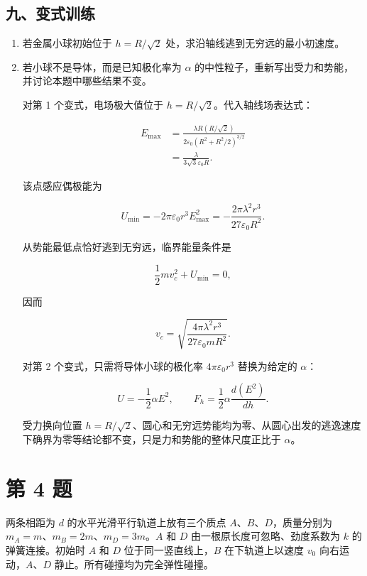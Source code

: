 \documentclass[12pt,a4paper,UTF8]{ctexart}
\begin{document}
\subsection{九、变式训练}\label{ux4e5dux53d8ux5f0fux8badux7ec3-2}

\begin{enumerate}
\def\labelenumi{\arabic{enumi}.}
\item
  若金属小球初始位于 \(h=R/\sqrt2\) 处，求沿轴线逃到无穷远的最小初速度。
\item
  若小球不是导体，而是已知极化率为 \(\alpha\)
  的中性粒子，重新写出受力和势能，并讨论本题中哪些结果不变。

  对第 1 个变式，电场极大值位于 \(h=R/\sqrt2\)。代入轴线场表达式：

  \[
  \begin{aligned}
  E_{\max}
  &=\frac{\lambda R(R/\sqrt2)}
  {2\varepsilon_0(R^2+R^2/2)^{3/2}}\\
  &=\frac{\lambda}{3\sqrt3\varepsilon_0R}.
  \end{aligned}
  \]

  该点感应偶极能为

  \[
  U_{\min}
  =-2\pi\varepsilon_0r^3E_{\max}^2
  =-\frac{2\pi\lambda^2r^3}
  {27\varepsilon_0R^2}.
  \]

  从势能最低点恰好逃到无穷远，临界能量条件是

  \[
  \frac12mv_c^2+U_{\min}=0,
  \]

  因而

  \[
  \boxed{
  v_c=\sqrt{\frac{4\pi\lambda^2r^3}
  {27\varepsilon_0mR^2}}
  }.
  \]

  对第 2 个变式，只需将导体小球的极化率 \(4\pi\varepsilon_0r^3\)
  替换为给定的 \(\alpha\)：

  \[
  U=-\frac12\alpha E^2,
  \qquad
  F_h=\frac12\alpha\frac{d(E^2)}{dh}.
  \]

  受力换向位置
  \(h=R/\sqrt2\)、圆心和无穷远势能均为零、从圆心出发的逃逸速度下确界为零等结论都不变，只是力和势能的整体尺度正比于
  \(\alpha\)。
\end{enumerate}

\newpage

\section{第 4 题}\label{ux7b2c-4-ux9898}

两条相距为 \(d\) 的水平光滑平行轨道上放有三个质点
\(A\)、\(B\)、\(D\)，质量分别为 \(m_A=m\)、\(m_B=2m\)、\(m_D=3m\)。\(A\)
和 \(D\) 由一根原长度可忽略、劲度系数为 \(k\) 的弹簧连接。初始时 \(A\)
和 \(D\) 位于同一竖直线上，\(B\) 在下轨道上以速度 \(v_0\)
向右运动，\(A\)、\(D\) 静止。所有碰撞均为完全弹性碰撞。
\end{document}
